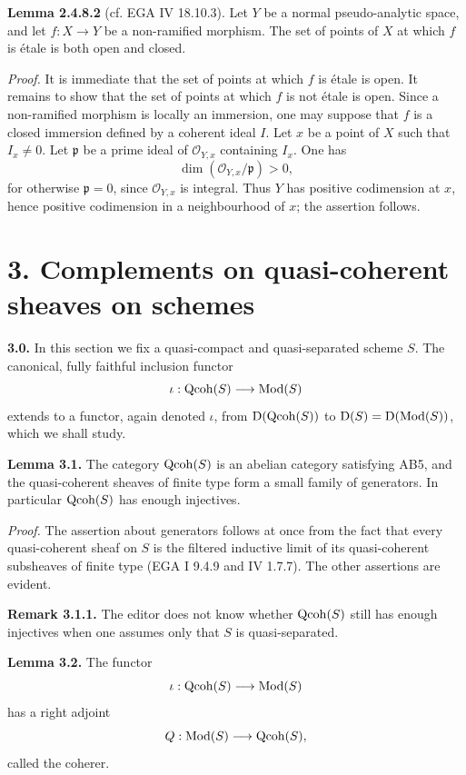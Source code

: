 \documentclass[11pt]{article}
\begin{document}
\textbf{Lemma 2.4.8.2} (cf. EGA IV 18.10.3). Let $Y$ be a normal pseudo-analytic space, and let $f:X\to Y$ be a non-ramified morphism. The set of points of $X$ at which $f$ is étale is both open and closed.

\emph{Proof.} It is immediate that the set of points at which $f$ is étale is open. It remains to show that the set of points at which $f$ is not étale is open. Since a non-ramified morphism is locally an immersion, one may suppose that $f$ is a closed immersion defined by a coherent ideal $I$. Let $x$ be a point of $X$ such that $I_x\ne0$. Let $\mathfrak p$ be a prime ideal of $\mathcal O_{Y,x}$ containing $I_x$. One has
\[
 \dim(\mathcal O_{Y,x}/\mathfrak p)>0,
\]
for otherwise $\mathfrak p=0$, since $\mathcal O_{Y,x}$ is integral. Thus $Y$ has positive codimension at $x$, hence positive codimension in a neighbourhood of $x$; the assertion follows.

\section*{3. Complements on quasi-coherent sheaves on schemes}

\textbf{3.0.} In this section we fix a quasi-compact and quasi-separated scheme $S$. The canonical, fully faithful inclusion functor
\[
 \iota:\operatorname{Qcoh}(S)\longrightarrow\operatorname{Mod}(S)
\]
extends to a functor, again denoted $\iota$, from $\mathrm D(\operatorname{Qcoh}(S))$ to $\mathrm D(S)=\mathrm D(\operatorname{Mod}(S))$, which we shall study.

\textbf{Lemma 3.1.} The category $\operatorname{Qcoh}(S)$ is an abelian category satisfying AB5, and the quasi-coherent sheaves of finite type form a small family of generators. In particular $\operatorname{Qcoh}(S)$ has enough injectives.

\emph{Proof.} The assertion about generators follows at once from the fact that every quasi-coherent sheaf on $S$ is the filtered inductive limit of its quasi-coherent subsheaves of finite type (EGA I 9.4.9 and IV 1.7.7). The other assertions are evident.

\textbf{Remark 3.1.1.} The editor does not know whether $\operatorname{Qcoh}(S)$ still has enough injectives when one assumes only that $S$ is quasi-separated.

\textbf{Lemma 3.2.} The functor
\[
 \iota:\operatorname{Qcoh}(S)\longrightarrow\operatorname{Mod}(S)
\]
has a right adjoint
\[
 Q:\operatorname{Mod}(S)\longrightarrow\operatorname{Qcoh}(S),
\]
called the coherer.
\end{document}
